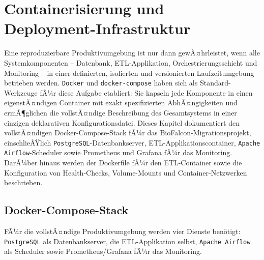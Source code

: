 ﻿\documentclass[12pt,a4paper]{report}
\theoremstyle{definition}
\theoremstyle{remark}
\newcommand{\pg}{\texttt{PostgreSQL}}
\newcommand{\airflow}{\texttt{Apache Airflow}}
\newcommand{\docker}{\texttt{Docker}}
\newcommand{\code}[1]{\texttt{#1}}
\begin{document}
\chapter{Containerisierung und Deployment-Infrastruktur}
\label{sec:docker}

Eine reproduzierbare Produktivumgebung ist nur dann gewÃ¤hrleistet, wenn alle Systemkomponenten -- Datenbank, ETL-Applikation, Orchestrierungsschicht und Monitoring -- in einer definierten, isolierten und versionierten Laufzeitumgebung betrieben werden. \docker{} und \code{docker-compose} haben sich als Standard-Werkzeuge fÃ¼r diese Aufgabe etabliert: Sie kapseln jede Komponente in einen eigenstÃ¤ndigen Container mit exakt spezifizierten AbhÃ¤ngigkeiten und ermÃ¶glichen die vollstÃ¤ndige Beschreibung des Gesamtsystems in einer einzigen deklarativen Konfigurationsdatei. Dieses Kapitel dokumentiert den vollstÃ¤ndigen Docker-Compose-Stack fÃ¼r das BioFalcon-Migrationsprojekt, einschlieÃŸlich \pg{}-Datenbankserver, ETL-Applikationscontainer, \airflow{}-Scheduler sowie Prometheus und Grafana fÃ¼r das Monitoring. DarÃ¼ber hinaus werden der Dockerfile fÃ¼r den ETL-Container sowie die Konfiguration von Health-Checks, Volume-Mounts und Container-Netzwerken beschrieben.

\section{Docker-Compose-Stack}

FÃ¼r die vollstÃ¤ndige Produktivumgebung werden vier Dienste ben\"otigt:
\pg{} als Datenbankserver, die ETL-Applikation selbst, \airflow{}
als Scheduler sowie Prometheus/Grafana fÃ¼r das Monitoring.
\end{document}
